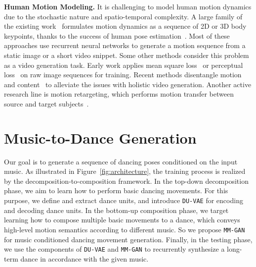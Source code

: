 \documentclass{article}
\newlength\secmargin
\begin{document}
\textbf{Human Motion Modeling.}
It is challenging to model human motion dynamics due to the stochastic nature and spatio-temporal complexity.
A large family of the existing work~\cite{chao2017forecasting,walker2017pose,yan2018mt,yang-3d-joints} formulates motion dynamics as a sequence of 2D or 3D body keypoints, thanks to the success of human pose estimation~\cite{cao2017realtime}.
Most of these approaches use recurrent neural networks to generate a motion sequence from a static image or a short video snippet. 
Some other methods consider this problem as a video generation task.
Early work applies mean square loss~\cite{srivastava2015unsupervised} or perceptual loss~\cite{mathieu2015deep} on raw image sequences for training.
Recent methods disentangle motion and content~\cite{denton2017unsupervised,tulyakov2017mocogan,vondrick2016generating} to alleviate the issues with holistic video generation.
Another active research line is motion retargeting, which performs motion transfer between source and target subjects~\cite{retargeting2019siggraph}.


\section{Music-to-Dance Generation}
\label{sec:model}
\vspace{\secmargin}
Our goal is to generate a sequence of dancing poses conditioned on the input music.
As illustrated in Figure~\ref{fig:architecture}, the training process is realized by the decomposition-to-composition framework.
In the top-down decomposition phase, we aim to learn how to perform basic dancing movements.
For this purpose, we define and extract dance units, and introduce \texttt{DU-VAE} for encoding and decoding dance units.
In the bottom-up composition phase, we target learning how to compose multiple basic movements to a dance, which conveys high-level motion semantics according to different music. So we propose \texttt{MM-GAN} for music conditioned dancing movement generation. 
Finally, in the testing phase, we use the components of \texttt{DU-VAE} and \texttt{MM-GAN} to recurrently synthesize a long-term dance in accordance with the given music.
\end{document}

